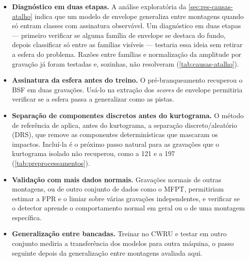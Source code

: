 \begin{itemize}
  \item \textbf{Diagnóstico em duas etapas.} A análise exploratória da
  \autoref{sec:res-causas-atalho} indica que um modelo de envelope generaliza
  entre montagens quando só entram classes com assinatura observável. Um
  diagnóstico em duas etapas --- primeiro verificar se alguma família de
  envelope se destaca do fundo, depois classificar só entre as famílias
  visíveis --- testaria essa ideia sem retirar a esfera do problema. Razões
  entre famílias e normalização da amplitude por gravação já foram testadas e,
  sozinhas, não resolveram (\autoref{tab:causas-atalho}).
  \item \textbf{Assinatura da esfera antes do treino.} O pré-branqueamento
  recuperou o BSF em duas gravações. Usá-lo na extração dos \emph{scores} de
  envelope permitiria verificar se a esfera passa a generalizar como as
  pistas.
  \item \textbf{Separação de componentes discretos antes do kurtograma.} O
  método de referência de \textcite{smith2015} aplica, antes do kurtograma, a
  separação discreto/aleatório (DRS), que remove as componentes determinísticas
  que mascaram os impactos. Incluí-la é o próximo passo natural para as
  gravações que o kurtograma isolado não recuperou, como a 121 e a 197
  (\autoref{tab:preprocessamentos}).
  \item \textbf{Validação com mais dados normais.} Gravações normais de outras
  montagens, ou de outro conjunto de dados como o MFPT, permitiriam estimar a
  FPR e o limiar sobre várias gravações independentes, e verificar se o detector
  aprende o comportamento normal em geral ou o de uma montagem específica.
  \item \textbf{Generalização entre bancadas.} Treinar no CWRU e testar em outro
  conjunto mediria a transferência dos modelos para outra máquina, o passo
  seguinte depois da generalização entre montagens avaliada aqui.
\end{itemize}
